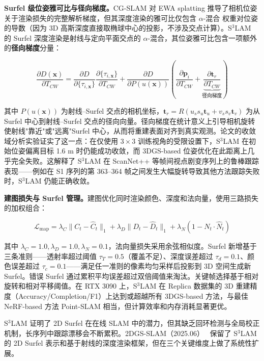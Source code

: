 \textbf{Surfel 级位姿雅可比与径向梯度。}CG-SLAM 对 EWA splatting 推导了相机位姿关于渲染损失的完整解析梯度，但其深度渲染的雅可比仅包含 $\alpha$-混合 权重对位姿的导数（因为 3D 高斯深度直接取椭球中心的投影，不涉及交点计算）。S$^3$LAM 的 Surfel 深度渲染是射线与定向平面交点的 $\alpha$-混合，其位姿雅可比包含一项额外的\textbf{径向梯度}分量：

\begin{equation*}
    \frac{\partial D(\mathbf{x})}{\partial T_{CW}} = \frac{\partial D}{\partial \{\tau_{i,\mathbf{x}}\}} \frac{\partial \{\tau_{i,\mathbf{x}}\}}{\partial T_{CW}} + \frac{\partial D}{\partial P(u(\mathbf{x}))} \left(\frac{\partial \mathbf{p}_i}{\partial T_{CW}} + \underbrace{\frac{\partial \mathbf{t}_r}{\partial T_{CW}}}_{\text{径向梯度}}\right)
\end{equation*}

其中 $P(u(\mathbf{x}))$ 为射线--Surfel 交点的相机坐标，$\mathbf{t}_r = R(u_s s_u \mathbf{t}_u + v_s s_v \mathbf{t}_v)$ 为从 Surfel 中心到射线--Surfel 交点的径向向量。径向梯度在统计意义上引导相机旋转使射线"靠近"或"远离"Surfel 中心，从而将重建表面对齐到真实观测。论文的收敛域分析实验证实了这一点：在仅使用 $3 \times 3$ 训练视角的受限设置下，S$^3$LAM 在初始位姿偏离目标 1.6 m 时仍能成功收敛，而 3DGS-based 位姿优化在此距离上几乎完全失败。这解释了 S$^3$LAM 在 ScanNet++ 等帧间视点剧变序列上的鲁棒跟踪表现——例如在 S1 序列的第 363--364 帧之间发生大幅旋转导致其他方法跟踪失败时，S$^3$LAM 仍能正确收敛。

\textbf{建图损失与 Surfel 管理。}建图优化同时渲染颜色、深度和法向量，使用三路损失的加权组合：

\begin{equation*}
    \mathcal{L}_\text{map} = \lambda_C \|C_t - \hat{C}_t\|_1 + \lambda_D \|D_t - \hat{D}_t\|_1 + \lambda_N (1 - N_t \cdot \hat{N}_t)
\end{equation*}

其中 $\lambda_C = 1.0, \lambda_D = 1.0, \lambda_N = 0.1$，法向量损失采用余弦相似度。Surfel 新增基于三条准则——透射率超过阈值 $\tau_T = 0.5$（覆盖不足）、深度误差超过 $\tau_d = 0.1$、颜色误差超过 $\tau_c = 0.1$——满足任一准则的像素均匀采样后投影到 3D 空间生成新 Surfel。错误 Surfel 通过累积平均误差超过双倍阈值来淘汰。关键帧选择基于相对旋转和相对平移阈值。在 RTX 3090 上，S$^3$LAM 在 Replica 数据集的 3D 重建精度（Accuracy/Completion/F1）上达到或超越所有 3DGS-based 方法，与最佳 NeRF-based 方法 Point-SLAM 相当，但计算效率和内存消耗显著更优。

S$^3$LAM 证明了 2D Surfel 在在线 SLAM 中的潜力，但其缺乏回环检测与全局校正机制，长序列中跟踪漂移会不断累积。2DGS-SLAM（2025.06）~\cite{2506_00970} 保留了 S$^3$LAM 的 2D Surfel 表示和基于射线的深度渲染框架，但在三个关键维度上做了系统性扩展。

